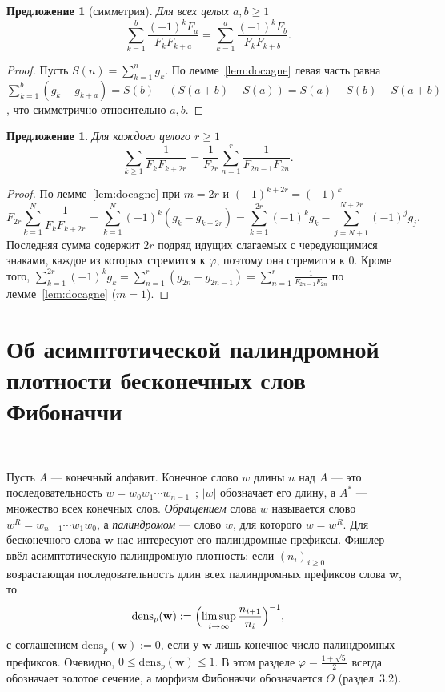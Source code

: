 \documentclass[a4paper,14pt]{extreport}
\theoremstyle{plain}
\newtheorem{proposition}[theorem]{Предложение}
\theoremstyle{definition}
\theoremstyle{remark}
\begin{document}
\begin{proposition}[симметрия]\label{prop:symm}
	Для всех целых $a,b\ge1$
	\begin{equation}
		\sum_{k=1}^{b}\frac{(-1)^kF_a}{F_kF_{k+a}}=\sum_{k=1}^{a}\frac{(-1)^kF_b}{F_kF_{k+b}} .
	\end{equation}
\end{proposition}
\begin{proof}
	Пусть $S(n)=\sum_{k=1}^n g_k$. По лемме~\ref{lem:docagne} левая часть равна $\sum_{k=1}^b(g_k-g_{k+a})=S(b)-(S(a+b)-S(a))=S(a)+S(b)-S(a+b)$, что симметрично относительно $a,b$.
\end{proof}

\begin{proposition}\label{prop:sum2r}
	Для каждого целого $r\ge1$
	\begin{equation}
		\sum_{k\ge1}\frac1{F_kF_{k+2r}}=\frac1{F_{2r}}\sum_{n=1}^{r}\frac1{F_{2n-1}F_{2n}} .
	\end{equation}
\end{proposition}
\begin{proof}
	По лемме~\ref{lem:docagne} при $m=2r$ и $(-1)^{k+2r}=(-1)^k$
	\begin{equation}
		F_{2r}\sum_{k=1}^{N}\frac1{F_kF_{k+2r}}=\sum_{k=1}^N(-1)^k(g_k-g_{k+2r})
		=\sum_{k=1}^{2r}(-1)^kg_k-\sum_{j=N+1}^{N+2r}(-1)^jg_j .
	\end{equation}
	Последняя сумма содержит $2r$ подряд идущих слагаемых с чередующимися знаками, каждое из которых стремится к $\varphi$, поэтому она стремится к $0$. Кроме того,
	$\sum_{k=1}^{2r}(-1)^kg_k=\sum_{n=1}^r(g_{2n}-g_{2n-1})=\sum_{n=1}^r\frac1{F_{2n-1}F_{2n}}$ по лемме~\ref{lem:docagne} ($m=1$).
\end{proof}
\section{Об асимптотической палиндромной плотности бесконечных слов Фибоначчи}~\label{sec3.6}

Пусть $A$ --- конечный алфавит. Конечное слово $w$ длины $n$ над $A$ --- это последовательность
$w=w_0w_1\cdots w_{n-1}$~\cite{Rigo}; $|w|$ обозначает его длину, а $A^*$ --- множество всех конечных слов.
\emph{Обращением} слова $w$ называется слово $w^R=w_{n-1}\cdots w_1w_0$, а \emph{палиндромом} --- слово $w$, для которого $w=w^R$.
Для бесконечного слова $\mathbf w$ нас интересуют его палиндромные префиксы. Фишлер~\cite{Fischler} ввёл
асимптотическую палиндромную плотность: если $(n_i)_{i\ge0}$ --- возрастающая последовательность длин всех палиндромных
префиксов слова $\mathbf w$, то
\begin{equation}\label{eqqintron1}
	\mathrm{dens}_p(\mathbf w):=\Bigl(\limsup_{i\to\infty}\frac{n_{i+1}}{n_i}\Bigr)^{-1},
\end{equation}
с соглашением $\mathrm{dens}_p(\mathbf w):=0$, если у $\mathbf w$ лишь конечное число палиндромных префиксов.
Очевидно, $0\le\mathrm{dens}_p(\mathbf w)\le1$. В этом разделе $\varphi=\frac{1+\sqrt5}2$ всегда обозначает
золотое сечение, а морфизм Фибоначчи обозначается $\Theta$ (раздел~3.2). 	
\end{document}
